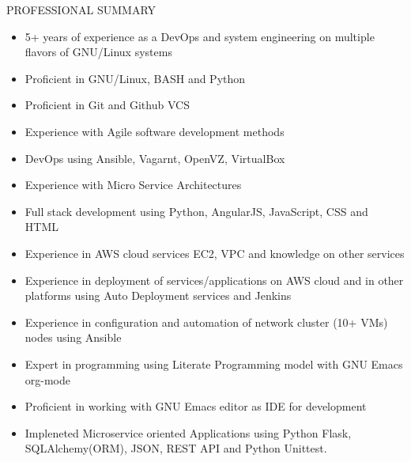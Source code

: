 \documentclass{resume} %
\begin{document}
\begin{rSection}{PROFESSIONAL SUMMARY}
  
  \begin{itemize}
    
  \item 5+ years of experience as a DevOps and system engineering on
    multiple flavors of GNU/Linux systems

  \item Proficient in GNU/Linux, BASH and Python

  \item Proficient in Git and Github VCS

  \item Experience with Agile software development methods

  \item DevOps using Ansible, Vagarnt, OpenVZ, VirtualBox
  
  \item Experience with Micro Service Architectures

  \item Full stack development using Python, AngularJS,
    JavaScript, CSS and HTML

  \item Experience in AWS cloud services EC2, VPC and knowledge on
    other services
    
  \item Experience in deployment of services/applications on AWS cloud
    and in other platforms using Auto Deployment services and Jenkins 

  \item Experience in configuration and automation of
    network cluster (10+ VMs) nodes using Ansible
    
  \item Expert in programming using Literate Programming model with
    GNU Emacs org-mode 

  \item Proficient in working with GNU Emacs editor as IDE
    for development

  \item Impleneted Microservice oriented Applications using
    Python Flask, SQLAlchemy(ORM), JSON, REST API and Python
    Unittest.
    
  \end{itemize}

\end{rSection}

\end{document}
